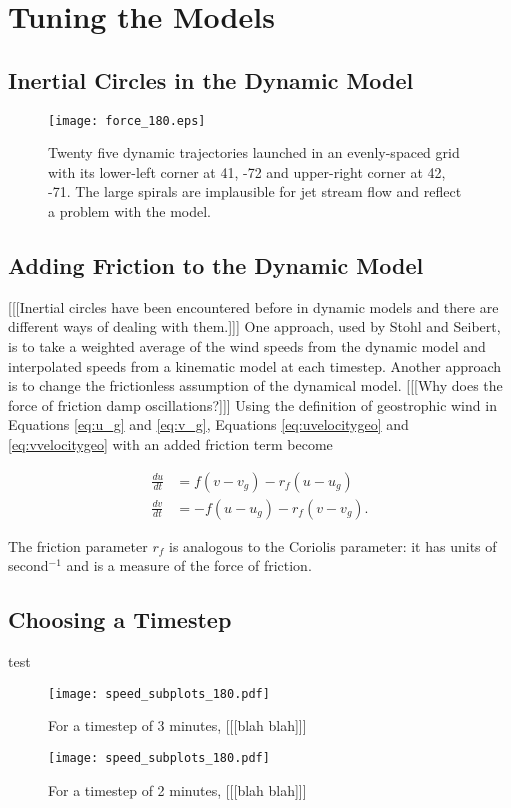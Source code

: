 \chapter{Tuning the Models}

\section{Inertial Circles in the Dynamic Model}

\begin{figure}
    \texttt{[image: force\_180.eps]}
    \centering
    \caption{Twenty five dynamic trajectories launched in an evenly-spaced grid with its lower-left corner at 41, -72 and upper-right corner at 42, -71. 
    The large spirals are implausible for jet stream flow and reflect a problem with the model.}
    \label{fig:force_180}
\end{figure}

\section{Adding Friction to the Dynamic Model}

[[[Inertial circles have been encountered before in dynamic models and there are different ways of dealing with them.]]] \cite{stohl_accuracy_1998}
One approach, used by Stohl and Seibert, is to take a weighted average of the wind speeds from the dynamic model and interpolated speeds from a kinematic model at each timestep.
Another approach is to change the frictionless assumption of the dynamical model.
[[[Why does the force of friction damp oscillations?]]]
Using the definition of geostrophic wind in Equations \ref{eq:u_g} and \ref{eq:v_g}, Equations \ref{eq:uvelocitygeo} and \ref{eq:vvelocitygeo} with an added friction term become

\begin{align}
    \frac{du}{dt} &= f (v - v_g) - r_f (u - u_g) \\
    \frac{dv}{dt} &= -f (u - u_g) - r_f (v - v_g).   
\end{align}

The friction parameter $r_f$ is analogous to the Coriolis parameter: it has units of second$^{-1}$ and is a measure of the force of friction.

\section{Choosing a Timestep} \label{sec:timestep}
test

\begin{figure}
    \texttt{[image: speed\_subplots\_180.pdf]}
    \centering
    \caption{For a timestep of 3 minutes, [[[blah blah]]]}
    \label{}
\end{figure}

\begin{figure}
    \texttt{[image: speed\_subplots\_180.pdf]}
    \centering
    \caption{For a timestep of 2 minutes, [[[blah blah]]]}
    \label{}
\end{figure}
